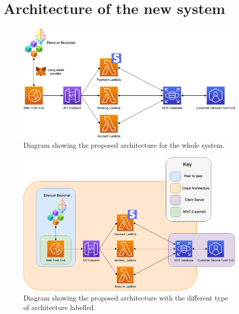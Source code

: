 \section{Architecture of the new system}

  \begin{figure}[H]
    \centering
    \includegraphics[width=12cm]{assets/architecture.drawio.png}
    \caption{Diagram showing the proposed architecture for the whole system.}
    \label{fig:architecture}
  \end{figure}  

  \begin{figure}[H]
    \centering
    \includegraphics[width=12cm]{assets/architectureSectioned.drawio.png}
    \caption{Diagram showing the proposed architecture with the different type of architecture labelled.}
    \label{fig:architectureSectioned}
  \end{figure}  

\newpage